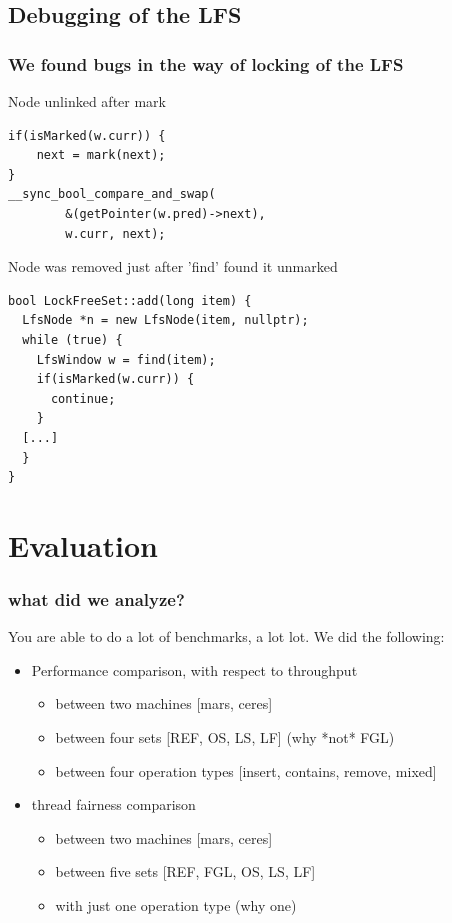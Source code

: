 \subsection{Debugging of the LFS}

\begin{frame}[fragile]
\frametitle{We found bugs in the way of locking of the LFS}

Node unlinked after mark
\begin{lstlisting}
if(isMarked(w.curr)) {
    next = mark(next);
}
__sync_bool_compare_and_swap(
        &(getPointer(w.pred)->next), 
        w.curr, next);
\end{lstlisting}
\end{frame}

\begin{frame}[fragile]
Node was removed just after 'find' found it unmarked
\begin{lstlisting}
bool LockFreeSet::add(long item) {
  LfsNode *n = new LfsNode(item, nullptr);
  while (true) {
    LfsWindow w = find(item);	
    if(isMarked(w.curr)) {
      continue;
    }
  [...]
  }
}
\end{lstlisting}
\end{frame}


\section{Evaluation}

\begin{frame}
\frametitle{what did we analyze?}
You are able to do a lot of benchmarks, a lot lot. We did the following:
\begin{itemize}
	\item Performance comparison, with respect to throughput
    \begin{itemize}
		\item between two machines [mars, ceres]
        \item between four sets [REF, OS, LS, LF] (why *not* FGL)
        \item between four operation types [insert, contains, remove, mixed]
	\end{itemize}
    \item thread fairness comparison
    \begin{itemize}
    	\item between two machines [mars, ceres]
		\item between five sets [REF, FGL, OS, LS, LF]
        \item with just one operation type (why one)
	\end{itemize}
\end{itemize}
\end{frame}

